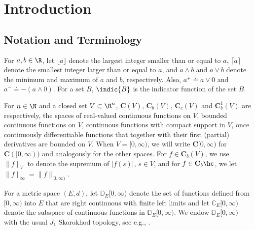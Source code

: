 \documentclass{article}
\begin{document}



\tableofcontents


\section{Introduction}\label{sec_intro}

\subsection{Notation and Terminology} \label{sec_notation}
For $a, b \in \R$, let $\lfloor a\rfloor$ denote the largest integer smaller than or equal to $a$, $\lceil a\rceil$ denote the smallest integer larger than or equal to $a$, and   $a \wedge b$ and $a \vee b$ denote the minimum and maximum of $a$ and $b$, respectively. Also,  $a^+\doteq a\vee 0$ and $a^-\doteq-(a\wedge 0)$. For a set $B$, $\indic{B}$ is the indicator function of the set $B$.

For  $n\in\N$ and  a closed set $V\subset\R^n$, $\mathbf{C}(V)$, $\mathbf{C}_b(V)$, $\mathbf{C}_c(V)$ and $\mathbf{C}^1_b(V)$  are respectively, the spaces of real-valued continuous functions on $V$, bounded continuous functions on $V$,  continuous functions with compact support in $V$, once continuously differentiable functions that together with their first (partial) derivatives are
bounded on $V$. When $V = [0,\infty)$, we will write $\mathbf{C}[0,\infty)$ for $\mathbf{C}([0,\infty))$ and analogously for the other spaces. For $f\in \mathbf{C}_b(V)$, we use $\|f\|_V$ to denote the supremum of $|f(s)|$, $s \in V$, and for $f\in\mathbf{C}_b\hc$, we let $\|f\|_\infty=\|f\|_{[0,\infty)} $. 

For a metric space $(E, d)$, let $\mathbb D_E[0,\infty)$ denote the set of functions defined from $[0,\infty)$ into $E$ that are right continuous with finite left limits
and let $\mathbb C_E[0,\infty)$ denote the subspace of continuous functions in $\mathbb D_E [0, \infty)$. We endow $\mathbb D_E [0,\infty)$ with the usual $J_1$ Skorokhod topology,
see e.g., \cite{KurtzBook}.

\end{document}

